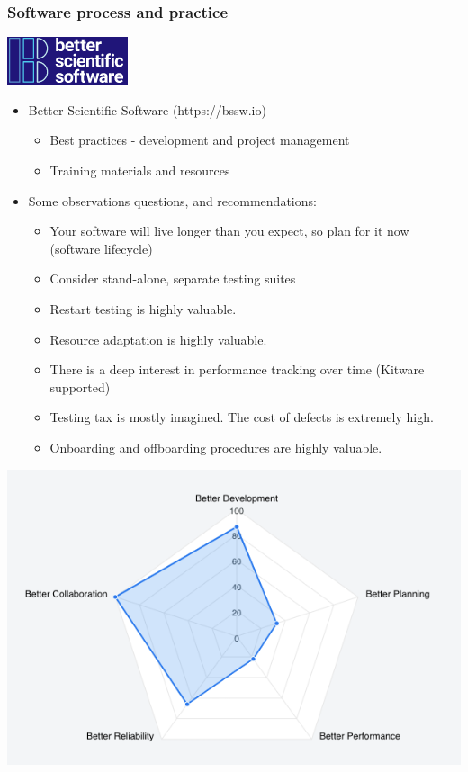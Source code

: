 \begin{frame}\frametitle{Software process and practice}\hspace{200pt}\includegraphics[width=.1\textwidth]{figures/bss.png}
\begin{multicols}{2}
\begin{itemize}
\item Better Scientific Software (https://bssw.io)
\begin{itemize}
\item Best practices - development and project management
\item Training materials and resources
\end{itemize}
\item Some observations questions, and recommendations:
\begin{itemize}
\item Your software will live longer than you expect, so plan for it now (software lifecycle)
\item Consider stand-alone, separate testing suites
\item Restart testing is highly valuable.
\item Resource adaptation is highly valuable.
\item There is a deep interest in performance tracking over time (Kitware supported)
\item Testing tax is mostly imagined.  The cost of defects is extremely high.
\item Onboarding and offboarding procedures are highly valuable.
\end{itemize}
\end{itemize}
\includegraphics[width=.4\textwidth]{figures/mirge_devel_process_eval.png}
\end{multicols}
\end{frame}

